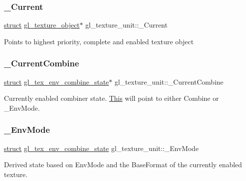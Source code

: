 \subsubsection{\texorpdfstring{\+\_\+\+Current}{\_Current}}
{\footnotesize\ttfamily \hyperlink{interfacestruct}{struct} \hyperlink{structgl__texture__object}{gl\+\_\+texture\+\_\+object}$\ast$ gl\+\_\+texture\+\_\+unit\+::\+\_\+\+Current}

Points to highest priority, complete and enabled texture object \mbox{\label{structgl__texture__unit_a388597ea29b69b6ea4d86f3557e6b1f5}} 
\subsubsection{\texorpdfstring{\+\_\+\+Current\+Combine}{\_CurrentCombine}}
{\footnotesize\ttfamily \hyperlink{interfacestruct}{struct} \hyperlink{structgl__tex__env__combine__state}{gl\+\_\+tex\+\_\+env\+\_\+combine\+\_\+state}$\ast$ gl\+\_\+texture\+\_\+unit\+::\+\_\+\+Current\+Combine}

Currently enabled combiner state. \hyperlink{namespace_this}{This} will point to either {\ttfamily Combine} or {\ttfamily \+\_\+\+Env\+Mode}. \mbox{\label{structgl__texture__unit_abd8e87a4b0420a6b8043fab2eedd8a82}} 
\subsubsection{\texorpdfstring{\+\_\+\+Env\+Mode}{\_EnvMode}}
{\footnotesize\ttfamily \hyperlink{interfacestruct}{struct} \hyperlink{structgl__tex__env__combine__state}{gl\+\_\+tex\+\_\+env\+\_\+combine\+\_\+state} gl\+\_\+texture\+\_\+unit\+::\+\_\+\+Env\+Mode}

Derived state based on {\ttfamily Env\+Mode} and the {\ttfamily Base\+Format} of the currently enabled texture. \mbox{\label{structgl__texture__unit_aab34963540ccb22d80e28accdbd13afb}} 
